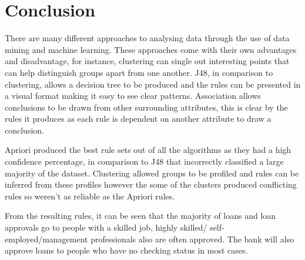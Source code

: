 \documentclass[12pt]{article}
\begin{document}
\section{Conclusion}
There are many different approaches to analysing data through the use of data mining and machine learning. These approaches come with their own advantages and disadvantage, for instance, clustering can single out interesting points that can help distinguish groups apart from one another. J48, in comparison to clustering, allows a decision tree to be produced and the rules can be presented in a visual format making it easy to see clear patterns. Association allows conclusions to be drawn from other surrounding attributes, this is clear by the rules it produces as each rule is dependent on another attribute to draw a conclusion. 

Apriori produced the best rule sets out of all the algorithms as they had a high confidence percentage, in comparison to J48 that incorrectly classified a large majority of the dataset. Clustering allowed groups to be profiled and rules can be inferred from these profiles however the some of the clusters produced conflicting rules so weren't as reliable as the Apriori rules. 

From the resulting rules, it can be seen that the majority of loans and loan approvals go to people with a skilled job, highly skilled/ self-employed/management professionals also are often approved. The bank will also approve loans to people who have no checking status in most cases. 
\end{document}
